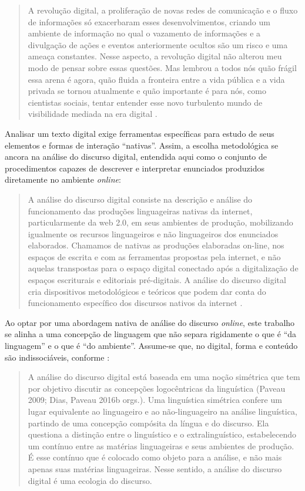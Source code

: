 \documentclass[portuguese]{textolivre}
\begin{document}
\begin{quote}
    A revolução digital, a proliferação de novas redes de comunicação e o fluxo de informações só exacerbaram esses desenvolvimentos, criando um ambiente de informação no qual o vazamento de informações e a divulgação de ações e eventos anteriormente ocultos são um risco e uma ameaça constantes. Nesse aspecto, a revolução digital não alterou meu modo de pensar sobre essas questões. Mas lembrou a todos nós quão frágil essa arena é agora, quão fluida a fronteira entre a vida pública e a vida privada se tornou atualmente e quão importante é para nós, como cientistas sociais, tentar entender esse novo turbulento mundo de visibilidade mediada na era digital \cite[p. 43]{Thompson2018InteracaoMediada}.
\end{quote}

Analisar um texto digital exige ferramentas específicas para estudo de seus elementos e formas de interação “nativas”. Assim, a escolha metodológica se ancora na análise do discurso digital, entendida aqui como o conjunto de procedimentos capazes de descrever e interpretar enunciados produzidos diretamente no ambiente \textit{online}:

\begin{quote}
    A análise do discurso digital consiste na descrição e análise do funcionamento das produções linguageiras nativas da internet, particularmente da web 2.0, em seus ambientes de produção, mobilizando igualmente os recursos linguageiros e não linguageiros dos enunciados elaborados. Chamamos de nativas as produções elaboradas on-line, nos espaços de escrita e com as ferramentas propostas pela internet, e não aquelas transpostas para o espaço digital conectado após a digitalização de espaços escriturais e editoriais pré-digitais. A análise do discurso digital cria dispositivos metodológicos e teóricos que podem dar conta do funcionamento específico dos discursos nativos da internet \cite[p. 57]{Paveau2021AnaliseDiscursoDigital}.
\end{quote}

Ao optar por uma abordagem nativa de análise do discurso \textit{online}, este trabalho se alinha a uma concepção de linguagem que não separa rigidamente o que é “da linguagem” e o que é “do ambiente”. Assume-se que, no digital, forma e conteúdo são indissociáveis, conforme \textcite[p. 58]{Paveau2021AnaliseDiscursoDigital}:

\begin{quote}
    A análise do discurso digital está baseada em uma noção simétrica que tem por objetivo discutir as concepções logocêntricas da linguística (Paveau 2009; Dias, Paveau 2016b orgs.). Uma linguística simétrica confere um lugar equivalente ao linguageiro e ao não-linguageiro na análise linguística, partindo de uma concepção compósita da língua e do discurso. Ela questiona a distinção entre o linguístico e o extralinguístico, estabelecendo um contínuo entre as matérias linguageiras e seus ambientes de produção. É esse contínuo que é colocado como objeto para a análise, e não mais apenas suas matérias linguageiras. Nesse sentido, a análise do discurso digital é uma ecologia do discurso.
\end{quote}
\end{document}
